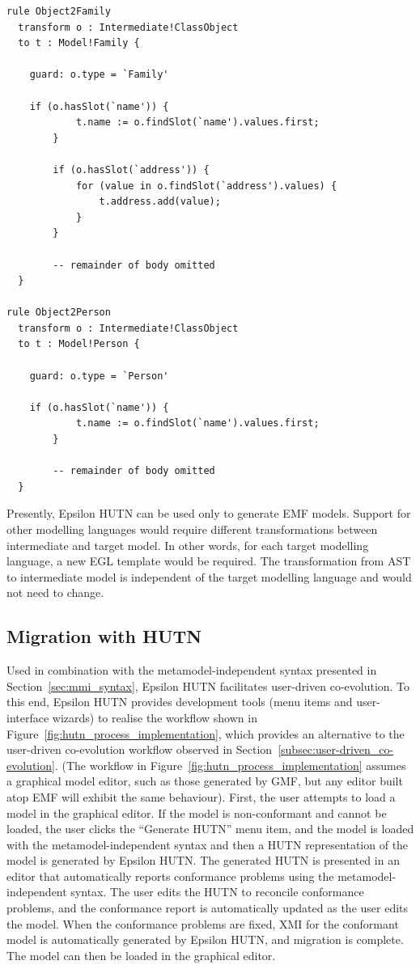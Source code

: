 \begin{lstlisting}[caption=The M2M transformation generated for the Families metamodel, label=lst:hutn_generated_transformation, language=ETL]
rule Object2Family
  transform o : Intermediate!ClassObject
  to t : Model!Family {

    guard: o.type = `Family'

    if (o.hasSlot(`name')) {
			t.name := o.findSlot(`name').values.first;
		}
		
		if (o.hasSlot(`address')) {
			for (value in o.findSlot(`address').values) {
				t.address.add(value);
			}
		}
		
		-- remainder of body omitted
  }

rule Object2Person
  transform o : Intermediate!ClassObject
  to t : Model!Person {

    guard: o.type = `Person'

    if (o.hasSlot(`name')) {
			t.name := o.findSlot(`name').values.first;
		}
		
		-- remainder of body omitted
  }
\end{lstlisting}

Presently, Epsilon HUTN can be used only to generate EMF models. Support for other modelling languages would require different transformations between intermediate and target model. In other words, for each target modelling language, a new EGL template would be required. The transformation from AST to intermediate model is independent of the target modelling language and would not need to change.


\subsection{Migration with HUTN}
\label{subsec:migration_with_hutn}
Used in combination with the metamodel-independent syntax presented in Section~\ref{sec:mmi_syntax}, Epsilon HUTN facilitates user-driven co-evolution. To this end, Epsilon HUTN provides development tools (menu items and user-interface wizards) to realise the workflow shown in Figure~\ref{fig:hutn_process_implementation}, which provides an alternative to the user-driven co-evolution workflow observed in Section~\ref{subsec:user-driven_co-evolution}. (The workflow in Figure~\ref{fig:hutn_process_implementation} assumes a graphical model editor, such as those generated by GMF, but any editor built atop EMF will exhibit the same behaviour). First, the user attempts to load a model in the graphical editor. If the model is non-conformant and cannot be loaded, the user clicks the ``Generate HUTN'' menu item, and the model is loaded with the metamodel-independent syntax and then a HUTN representation of the model is generated by Epsilon HUTN. The generated HUTN is presented in an editor that automatically reports conformance problems using the metamodel-independent syntax. The user edits the HUTN to reconcile conformance problems, and the conformance report is automatically updated as the user edits the model. When the conformance problems are fixed, XMI for the conformant model is automatically generated by Epsilon HUTN, and migration is complete. The model can then be loaded in the graphical editor.

